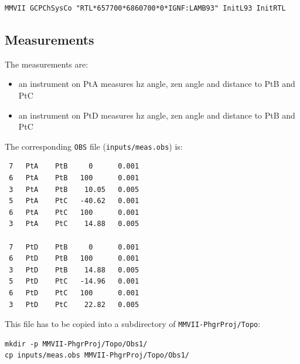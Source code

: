 \begin{lstlisting}
MMVII GCPChSysCo "RTL*657700*6860700*0*IGNF:LAMB93" InitL93 InitRTL
\end{lstlisting}

\subsection{Measurements}
The measurements are:
\begin{itemize}
   \item an instrument on PtA measures hz angle, zen angle and distance to PtB and PtC
   \item an instrument on PtD measures hz angle, zen angle and distance to PtB and PtC
\end{itemize}
The corresponding \texttt{OBS} file (\texttt{inputs/meas.obs}) is:
\begin{verbatim}
 7   PtA    PtB     0      0.001
 6   PtA    PtB   100      0.001
 3   PtA    PtB    10.05   0.005
 5   PtA    PtC   -40.62   0.001
 6   PtA    PtC   100      0.001
 3   PtA    PtC    14.88   0.005

 7   PtD    PtB     0      0.001
 6   PtD    PtB   100      0.001
 3   PtD    PtB    14.88   0.005
 5   PtD    PtC   -14.96   0.001
 6   PtD    PtC   100      0.001
 3   PtD    PtC    22.82   0.005
\end{verbatim}
This file has to be copied into a subdirectory of \texttt{MMVII-PhgrProj/Topo}:
\begin{lstlisting}
mkdir -p MMVII-PhgrProj/Topo/Obs1/
cp inputs/meas.obs MMVII-PhgrProj/Topo/Obs1/
\end{lstlisting}


